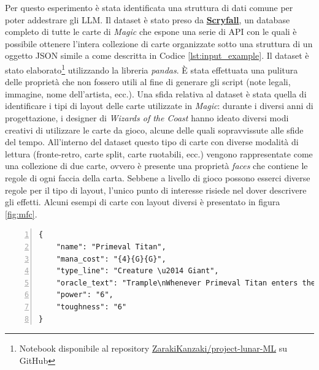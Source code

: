 Per questo esperimento è stata identificata una struttura di dati comune per poter addestrare gli LLM.
Il dataset è stato preso da \textbf{\href{https://scryfall.com/}{Scryfall}}, un database completo  di tutte le carte di \textit{Magic} che espone una serie di API con le quali è possibile ottenere l'intera collezione di carte organizzate sotto una struttura di un oggetto JSON simile a come descritta in Codice \ref{lst:input_example}.
Il dataset è stato elaborato\footnote{Notebook disponibile al repository \href{https://github.com/ZarakiKanzaki/project-lunar-ML/blob/main/ExploratoryDataAnalysisScryfall.ipynb}{ZarakiKanzaki/project-lunar-ML} su GitHub} utilizzando la libreria \textit{pandas}. È stata effettuata una pulitura delle proprietà che non fossero utili al fine di generare gli script (note legali, immagine, nome dell'artista, ecc.).
Una sfida relativa al dataset è stata quella di identificare i tipi di layout delle carte utilizzate in \emph{Magic}: durante i diversi anni di progettazione, i designer di \textit{Wizards of the Coast} hanno ideato diversi modi creativi di utilizzare le carte da gioco, alcune delle quali sopravvissute alle sfide del tempo. All'interno del dataset questo tipo di carte con diverse modalità di lettura (fronte-retro, carte split, carte ruotabili, ecc.) vengono rappresentate come una collezione di due carte, ovvero è presente una proprietà \textit{faces} che contiene le regole di ogni faccia della carta. Sebbene a livello di gioco possono esserci diverse regole per il tipo di layout, l'unico punto di interesse risiede nel dover descrivere gli effetti. Alcuni esempi di carte con layout diversi è presentato in figura \ref{fig:mfc}.
\begin{algorithm}[ht]
	\caption{Esempio di input da convertire}
	\label{lst:input_example}
	\begin{Verbatim}[numbers=left,breaklines]
{
    "name": "Primeval Titan",
    "mana_cost": "{4}{G}{G}",
    "type_line": "Creature \u2014 Giant",
    "oracle_text": "Trample\nWhenever Primeval Titan enters the battlefield or attacks, you may search your library for up to two land cards, put them onto the battlefield tapped, then shuffle.",
    "power": "6",
    "toughness": "6"
}
	\end{Verbatim}
\end{algorithm}

